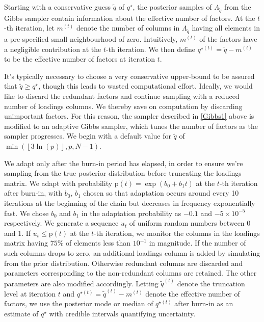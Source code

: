 \documentclass[a4paper,12pt,fleqn]{article}
\numberwithin{equation}{section}
\begin{document}
Starting with a conservative guess $\tilde{q}$ of $q^\star$, the posterior samples of $\Lambda_{\tilde{q}}$ from the Gibbs sampler contain information about the effective number of factors. At the $t$-th iteration, let $m^{\left(t\right)}$ denote the number of columns in $\Lambda_{\tilde{q}}$ having all elements in a pre-specified small neighbourhood of zero. Intuitively, $m^{\left(t\right)}$ of the factors have a negligible contribution at the $t$-th iteration. We then define $q^{\star\left(t\right)} = \tilde{q} - m^{\left(t\right)}$ to be the effective number of factors at iteration $t$.

It's typically necessary to choose a very conservative upper-bound to be assured that $\tilde{q} \geq q^\star$, though this leads to wasted computational effort. Ideally, we would like to discard the redundant factors and continue sampling with a reduced number of loadings columns. We thereby save on computation by discarding unimportant factors. For this reason, the sampler described in \ref{Gibbs1} above is modified to an adaptive Gibbs sampler, which tunes the number of factors as the sampler progresses. We begin with a default value for $\tilde{q}$ of $\min\left(\left\lfloor 3\ln(p)\right\rfloor, p, N-1\right)$.

We adapt only after the burn-in period has elapsed, in order to ensure we're sampling from the true posterior distribution before truncating the loadings matrix. We adapt with probability $\mathrm{p}\left(t\right) = \exp\left(b_0 + b_1t\right)$ at the $t$-th iteration after burn-in, with $b_0$, $b_1$ chosen so that adaptation occurs around every 10 iterations at the beginning of the chain but decreases in frequency exponentially fast. We chose $b_0$ and $b_1$ in the adaptation probability as $-0.1$ and $-5 \times 10^{-5}$ respectively. We generate a sequence $u_t$ of uniform random numbers between $0$ and $1$. If $u_t \leq \mathrm{p}\left(t\right)$ at the $t$-th iteration, we monitor the columns in the loadings matrix having $75\%$ of elements less than $10^{-1}$ in magnitude. If the number of such columns drops to zero, an additional loadings column is added by simulating from the prior distribution. Otherwise redundant columns are discarded and parameters corresponding to the non-redundant columns are retained. The other parameters are also modified accordingly. Letting $\tilde{q}^{\left(t\right)}$ denote the truncation level at iteration $t$ and $q^{\star\left(t\right)} = \tilde{q}^{\left(t\right)} - m^{\left(t\right)}$ denote the effective number of factors, we use the posterior mode or median of $q^{\star\left(t\right)}$ after burn-in as an estimate of $q^\star$ with credible intervals quantifying uncertainty.
\end{document}
